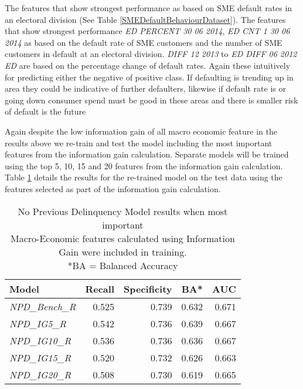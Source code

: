 The features that show strongest performance as based on SME default rates in an electoral division (See Table \ref{SMEDefaultBehaviourDataset}). The features that show strongest performance \textit{ED PERCENT 30 06 2014}, \textit{ED CNT 1 30 06 2014} as based on the default rate of SME customers and the number of SME customers in default at an electoral division. \textit{DIFF 12 2013} to \textit{ED DIFF 06 2012 ED} are based on the percentage change of default rates. Again these intuitively for predicting either the negative of positive class. If defaulting is trending up in area they could be indicative of further defaulters, likewise if default rate is or going down consumer spend must be good in these areas and there is smaller risk of default is the future

Again despite the low information gain of all macro economic feature in the results above we re-train and test the model including the most important features from the information gain calculation. Separate models will be trained using the top 5, 10, 15 and 20 features from the information gain calculation. Table \ref{table:InfoGainNPDModelResults} details the results for the re-trained model on the test data using the features selected as part of the information gain calculation.


\begin{table}[H]
\centering
\small
		\begin{tabular}{l r r r r}
			\hline
			\textbf{Model} & \textbf{Recall} & \textbf{Specificity} & \textbf{BA*} & \textbf{AUC}  \\ \hline
			\textit{NPD\_Bench\_R} & 0.525 & \cellcolor{green!25}0.739 & 0.632 & \cellcolor{green!25}0.671   \\ \hline
			\textit{NPD\_IG5\_R} & \cellcolor{green!25}0.542 & 0.736 & \cellcolor{green!25}0.639 & 0.667   \\ 
			\textit{NPD\_IG10\_R} & 0.536 & 0.736 & 0.636 & 0.667  \\ 
			\textit{NPD\_IG15\_R} & 0.520 & 0.732 & 0.626 & 0.663 \\
			\textit{NPD\_IG20\_R} &  0.508 & 0.730 & 0.619 & 0.665  \\\hline 
		\end{tabular}
	\caption{No Previous Delinquency Model results when most important \\Macro-Economic features calculated using Information Gain were included in training.\\
		*BA = Balanced Accuracy}
	\label{table:InfoGainNPDModelResults}
\end{table}

